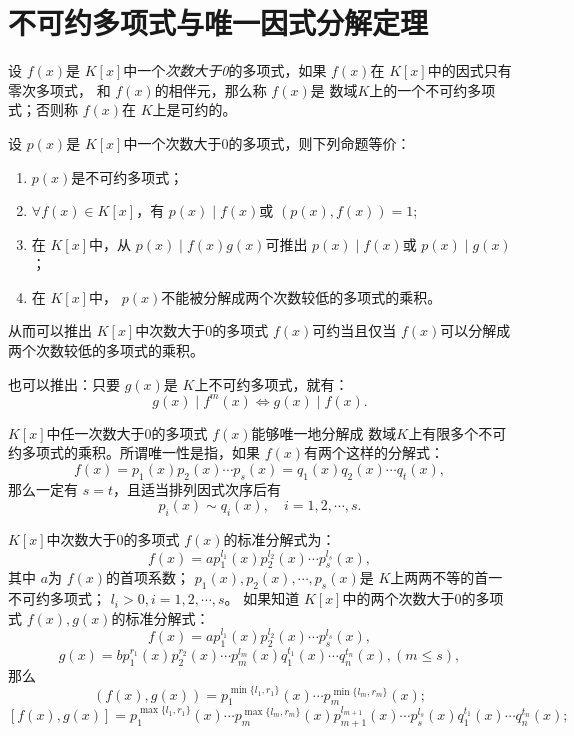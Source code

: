 \section{不可约多项式与唯一因式分解定理}
\begin{mydef}
    设 $f(x)$是 $K[x]$中一个\emph{次数大于0}的多项式，如果 $f(x)$在 $K[x]$中的因式只有零次多项式，
    和 $f(x)$的相伴元，那么称 $f(x)$是 数域$K$上的一个不可约多项式；否则称 $f(x)$在 $K$上是可约的。
\end{mydef}
\begin{mythm}
    设 $p(x)$是 $K[x]$中一个次数大于0的多项式，则下列命题等价：
    \begin{enumerate}
        \item $p(x)$是不可约多项式；
        \item $\forall f(x)\in K[x]$，有 $p(x)\mid f(x)$或 $(p(x),f(x))=1$;
        \item 在 $K[x]$中，从 $p(x)\mid f(x)g(x)$可推出 $p(x)\mid f(x)$或 $p(x)\mid g(x)$；
        \item 在 $K[x]$中， $p(x)$不能被分解成两个次数较低的多项式的乘积。
    \end{enumerate}
\end{mythm}
\begin{myrmk}
    从而可以推出 $K[x]$中次数大于0的多项式 $f(x)$可约当且仅当 $f(x)$可以分解成两个次数较低的多项式的乘积。
\end{myrmk}
\begin{myrmk}
    也可以推出：只要 $g(x)$是 $K$上不可约多项式，就有：
    \[g(x)\mid f^m(x)\Leftrightarrow g(x)\mid f(x).\]
\end{myrmk}
\begin{mythm}[唯一因式分解定理]
   $K[x]$中任一次数大于0的多项式 $f(x)$能够唯一地分解成 数域$K$上有限多个不可约多项式的乘积。所谓唯一性是指，如果 $f(x)$有两个这样的分解式：
   \[f(x)=p_1(x)p_2(x)\cdots p_s(x)=q_1(x)q_2(x)\cdots q_t(x),\]
   那么一定有 $s=t$，且适当排列因式次序后有
   \[p_i(x)\sim q_i(x),\quad i=1,2,\cdots,s.\] 
\end{mythm}
$K[x]$中次数大于0的多项式 $f(x)$的标准分解式为：
\[f(x)=ap_1^{l_1}(x)p_2^{l_2}(x)\cdots p_s^{l_s}(x),\]
其中 $a$为 $f(x)$的首项系数； $p_1(x),p_2(x),\cdots,p_s(x)$是 $K$上两两不等的首一不可约多项式； $l_i>0,i=1,2,\cdots,s$。
如果知道 $K[x]$中的两个次数大于0的多项式 $f(x),g(x)$的标准分解式：
\[f(x)=ap_1^{l_1}(x)p_2^{l_2}(x)\cdots p_s^{l_s}(x),\]
\[g(x)=bp_1^{r_1}(x)p_2^{r_2}(x)\cdots p_m^{l_m}(x)q_1^{t_1}(x)\cdots q_n^{t_n}(x),(m\leq s),\]
那么
\[(f(x),g(x))=p_1^{\min\{l_1,r_1\}}(x)\cdots p_m^{\min\{l_m,r_m\}}(x);\]
\[[f(x),g(x)]=p_1^{\max\{l_1,r_1\}}(x)\cdots p_m^{\max\{l_m,r_m\}}(x)p_{m+1}^{l_{m+1}}(x)\cdots p_s^{l_s}(x)q_1^{t_1}(x)\cdots q_n^{t_n}(x);\]
